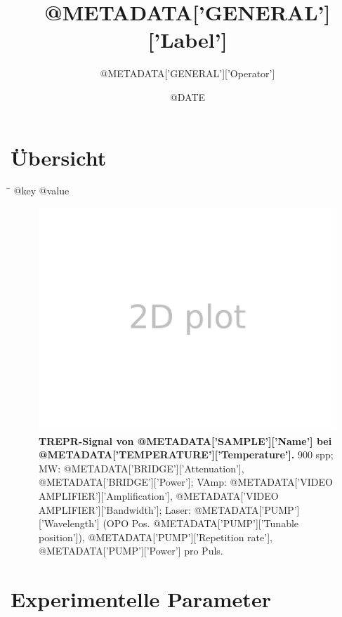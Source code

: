 \documentclass{article}
\begin{document}
\title{{@METADATA['GENERAL']['Label']}}
\author{{@METADATA['GENERAL']['Operator']}}
\date{{@DATE}}
\maketitle

\section*{Übersicht}

\begin{tabbing}
	\hspace{3.5cm} \= \kill
	{@key} \> {@value}
	\\
\end{tabbing}

\begin{figure}[H]
	\includegraphics[width=\textwidth]{Plotter2D}
	\caption{\textbf{TREPR-Signal von {@METADATA['SAMPLE']['Name']} bei {@METADATA['TEMPERATURE']['Temperature']}.} 900 spp; MW: {@METADATA['BRIDGE']['Attenuation']}, {@METADATA['BRIDGE']['Power']}; VAmp: {@METADATA['VIDEO AMPLIFIER']['Amplification']}, {@METADATA['VIDEO AMPLIFIER']['Bandwidth']}; Laser: {@METADATA['PUMP']['Wavelength']} (OPO Pos. {@METADATA['PUMP']['Tunable position']}), {@METADATA['PUMP']['Repetition rate']}, {@METADATA['PUMP']['Power']} pro Puls.} 
\end{figure}

\clearpage
\section*{Experimentelle Parameter}
\end{document}
